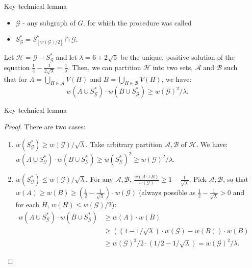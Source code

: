 \documentclass{beamer}
\newcommand{\br}[1]{\mathopen{}\left( #1 \right)}
\newcommand{\fl}[1]{\mathopen{}\left\lfloor #1 \right\rfloor}
\begin{document}
\begin{frame}{Key technical lemma}

    \begin{itemize}
        \item $\mathcal{G}$ - any subgraph of $G$, for which the procedure was called
        \pause
        \item $S_{\mathcal{G}}^*=S_{\fl{w\br{\mathcal{G}}/2}}^*\cap \mathcal{G}$.
    \end{itemize}
    \pause
    \begin{lemma}\label{lambda_lemma}
        Let $\mathcal{H}=\mathcal{G}-S_{\mathcal{G}}^*$ and let $\lambda=6+2\sqrt{5}$ be the unique, positive solution of the equation $\frac{1}{4}-\frac{1}{2\sqrt{\lambda}}=\frac{1}{\lambda}$. Then, we can partition $\mathcal{H}$ into two sets, $\mathcal{A}$ and $\mathcal{B}$ such that for $A=\bigcup_{H\in\mathcal{A}}V\br{H}$ and $B=\bigcup_{H\in\mathcal{B}}V\br{H}$, we have:
        $$w\br{A\cup S_{\mathcal{G}}^*}\cdot w\br{B\cup S_{\mathcal{G}}^*}\geq w\br{\mathcal{G}}^2/\lambda.$$
    \end{lemma}

\end{frame}

\begin{frame}{Key technical lemma}
\begin{proof}
                There are two cases:
                \begin{enumerate}
                    \item $w\br{ S_{\mathcal{G}}^*}\geq w\br{\mathcal{G}}/\sqrt{\lambda}$. Take arbitrary partition $\mathcal{A}, \mathcal{B}$ of $\mathcal{H}$. We have:
                    $w\br{A\cup S_{\mathcal{G}}^*}\cdot w\br{B\cup S_{\mathcal{G}}^*}\geq w\br{ S_{\mathcal{G}}^*}^2 \geq w\br{\mathcal{G}}^2/\lambda.$
                \pause
                \item $w\br{ S_{\mathcal{G}}^*} \leq w\br{\mathcal{G}}/\sqrt{\lambda}$.
                For any $\mathcal{A},\mathcal{B}$, $\frac{w\br{A\cup B}}{w\br{\mathcal{G}}}\geq 1-\frac{1}{\sqrt{\lambda}}$. Pick $\mathcal{A},\mathcal{B}$, so that $w\br{A}\geq w\br{B}\geq \br{\frac{1}{2}-\frac{1}{\sqrt{\lambda}}}\cdot w\br{\mathcal{G}}$ (always possible as $\frac{1}{2}-\frac{1}{\sqrt{\lambda}}>0$ and for each $H$, $w\br{H}\leq w\br{\mathcal{G}}/2$):
                \pause
                \begin{align*}
                w\br{A\cup S_{\mathcal{G}}^*}\cdot w\br{B\cup S_{\mathcal{G}}^*}&\geq w\br{A}\cdot w\br{B} \\&\geq \br{\br{1-{1}/{\sqrt{\lambda}}}\cdot w\br{\mathcal{G}}-w\br{B}}\cdot w\br{B}\\&\geq  {w\br{\mathcal{G}}^2}/{2}\cdot \br{{1}/{2}-{1}/{\sqrt{\lambda}}} = {w\br{\mathcal{G}}^2}/{\lambda}.   
                \end{align*}
            
                \end{enumerate}
            \end{proof}
\end{frame}
\end{document}
